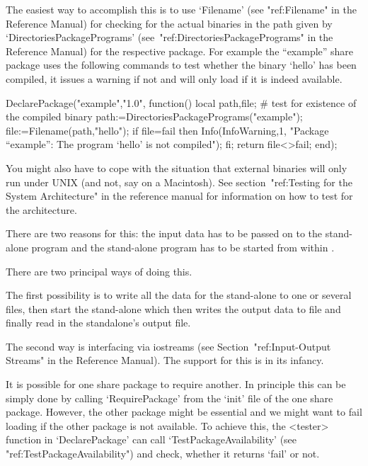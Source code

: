 The easiest way to accomplish this is to use `Filename' (see "ref:Filename"
in the Reference Manual) for checking for  the actual binaries in the path
given by `DirectoriesPackagePrograms' (see~"ref:DirectoriesPackagePrograms"
in the Reference Manual) for the respective package. For example
the ``example'' share package uses the following commands to test whether
the binary `hello' has been compiled, it issues a warning if not and will
only load if it is indeed available.

\begintt
DeclarePackage("example","1.0",
  function()
  local path,file;
    # test for existence of the compiled binary
    path:=DirectoriesPackagePrograms("example");
    file:=Filename(path,"hello");
    if file=fail then
      Info(InfoWarning,1,
        "Package ``example'': The program `hello' is not compiled");
    fi;
    return file<>fail;
  end);
\endtt

You might also have to cope with the situation that external binaries will
only run under UNIX (and not, say on a Macintosh). See section~"ref:Testing
for the System Architecture" in the reference manual for information on how
to test for the architecture.


There are two reasons for this: the input data has  to be passed on to
the stand-alone program and the  stand-alone program  has to be  started
from within {\GAP}.

There are two principal ways of doing this.  

The first possibility is to write  all the data  for the stand-alone to
one or several files, then start the stand-alone  which then writes the
output data to file and finally read in the standalone's output file.

The second way is interfacing via iostreams (see 
Section~"ref:Input-Output Streams" in the Reference Manual).
The support for this is in its infancy.


It is possible for one share package to require another. In principle this
can be simply done by calling `RequirePackage' from the `init' file of the
one share package. However, the other package might be essential and we
might want to fail loading if the other package is not available. To achieve
this,  the <tester> function in `DeclarePackage' can call
`TestPackageAvailability'  (see "ref:TestPackageAvailability") and check,
whether it returns `fail' or not.

